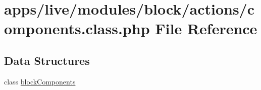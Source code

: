 \hypertarget{live_2modules_2block_2actions_2components_8class_8php}{\section{apps/live/modules/block/actions/components.class.\-php File Reference}
\label{live_2modules_2block_2actions_2components_8class_8php}
}
\subsection*{Data Structures}
\begin{DoxyCompactItemize}
\item 
class \hyperlink{classblock_components}{block\-Components}
\end{DoxyCompactItemize}

